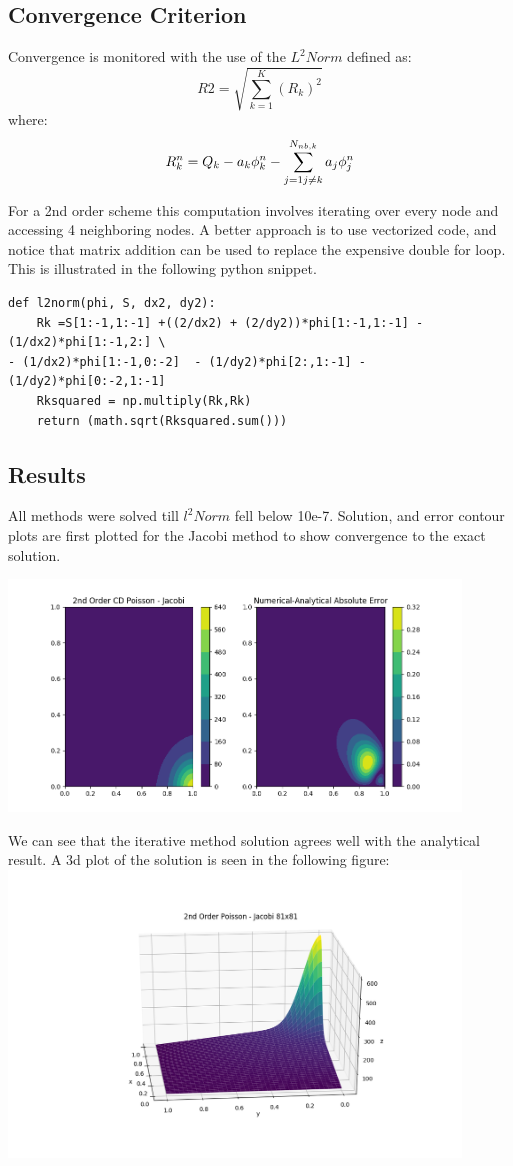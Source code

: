 \documentclass[11pt]{article}
\begin{document}
\subsection{Convergence Criterion}
\label{sec-1-7}
Convergence is monitored with the use of the $L^{2}Norm$ defined as:
\[
R2 = \sqrt{ \sum_{k=1}^{K} ( R_{k})^{2} }
\]
where:
\[
R_{k}^{n} = Q_{k} -a_{k} \phi_{k}^{n} - \sum_{j=1 \\ j \neq k}^{N_{nb,k}}  a_{j} \phi_{j}^{n}  
\]

For a 2nd order scheme this computation involves iterating over every node and accessing 4 neighboring nodes. A better approach is to use vectorized code, and notice that matrix addition can be used to replace the expensive double for loop. This is illustrated in the following python snippet.
\begin{verbatim}
def l2norm(phi, S, dx2, dy2):
    Rk =S[1:-1,1:-1] +((2/dx2) + (2/dy2))*phi[1:-1,1:-1] - (1/dx2)*phi[1:-1,2:] \
- (1/dx2)*phi[1:-1,0:-2]  - (1/dy2)*phi[2:,1:-1] - (1/dy2)*phi[0:-2,1:-1] 
    Rksquared = np.multiply(Rk,Rk)
    return (math.sqrt(Rksquared.sum()))
\end{verbatim}


\subsection{Results}
\label{sec-1-8}
All methods were solved till $l^{2}Norm$ fell below 10e-7.
Solution, and error contour plots are first plotted for the Jacobi method to show convergence to the exact solution. 

\includegraphics[width=12cm]{./figures/solution.png}

We can see that the iterative method solution agrees well with the analytical result.
A 3d plot of the solution is seen in the following figure:
\includegraphics[width=12cm]{./figures/3d.png}
\end{document}
